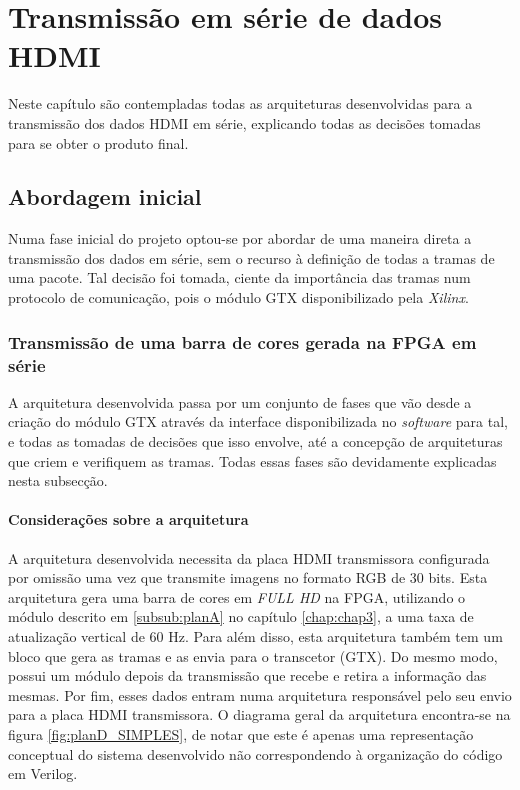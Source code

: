 \chapter{Transmissão em série de dados HDMI} \label{chap:chap5}

Neste capítulo são contempladas todas as arquiteturas desenvolvidas para a transmissão dos dados HDMI em série, explicando todas as decisões tomadas para se obter o produto final. 

\section{Abordagem inicial}

Numa fase inicial do projeto optou-se por abordar de uma maneira direta a transmissão dos dados em série, sem o recurso à definição de todas a tramas de uma pacote. Tal decisão foi tomada, ciente da importância das tramas num protocolo de comunicação, pois o módulo GTX disponibilizado pela \textit{Xilinx}.

\subsection{Transmissão de uma barra de cores gerada na FPGA em série} \label{sub:planD}

A arquitetura desenvolvida passa por um conjunto de fases que vão desde a criação do módulo GTX através da interface disponibilizada no \textit{software} para tal, e todas as tomadas de decisões que isso envolve, até a concepção de arquiteturas que criem e verifiquem as tramas. Todas essas fases são devidamente explicadas nesta subsecção.

\subsubsection{Considerações sobre a arquitetura} \label{subsub:planD_considerações}

A arquitetura desenvolvida necessita da placa HDMI transmissora configurada por omissão uma vez que transmite imagens no formato RGB de 30 bits.  Esta arquitetura gera uma barra de cores em \textit{FULL HD} na FPGA, utilizando o módulo descrito em \ref{subsub:planA} no capítulo \ref{chap:chap3}, a uma taxa de atualização vertical de 60 Hz. Para além disso, esta arquitetura também tem um bloco que gera as tramas e as envia para o transcetor (GTX). Do mesmo modo, possui um módulo depois da transmissão que recebe e retira a informação das mesmas. Por fim, esses dados entram numa arquitetura responsável pelo seu envio para a placa HDMI transmissora. O diagrama geral da arquitetura encontra-se na figura \ref{fig:planD_SIMPLES}, de notar que este é apenas uma representação conceptual do sistema desenvolvido não correspondendo à organização do código em Verilog.



